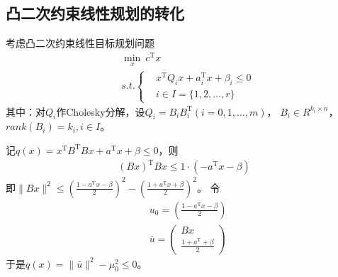     \subsection{凸二次约束线性规划的转化}
        \par
        考虑凸二次约束线性目标规划问题
        \begin{align*}
          & \mathop{\min}\limits_x \  c^\mathrm{T} x\\
          & s.t.\left\{
            \begin{aligned}
             &x^\mathrm{T} Q_i x+a_i^\mathrm{T} x+{\beta}_i \leqslant 0\\
             &i \in I=\{1,2,\ldots,r\}
            \end{aligned}
             \right.
        \end{align*}
        其中：对$Q_i$作Cholesky分解，设$Q_i=B_iB_i^\mathrm{T} (i=0,1,\ldots,m)$，
        $B_i \in R^{k_i\times n}$，$rank(B_i)=k_i,i \in I$。
        \par
        记$q(x)=x^\mathrm{T} B^\mathrm{T} Bx+a^\mathrm{T} x+\beta \leqslant 0$，则
        \begin{align*}
          (Bx)^\mathrm{T} Bx \leqslant 1\cdot (-a^\mathrm{T} x-\beta)
        \end{align*}
        即$\|Bx\|^2 \leqslant (\frac{1-a^\mathrm{T}x -\beta}{2})^2-(\frac{1+a^\mathrm{T}x +\beta}{2})^2$。
        令
        \begin{align*}
          &u_0= \left( \frac{1-a^\mathrm{T} x-\beta}{2} \right) \\
          &\bar{u}=\begin{pmatrix} Bx \\\frac{1+a^\mathrm{T} +\beta}{2}\end{pmatrix}
        \end{align*}
        于是$q(x)=\|\bar{u}\|^2-{\mu}_0^2 \leqslant 0$。
